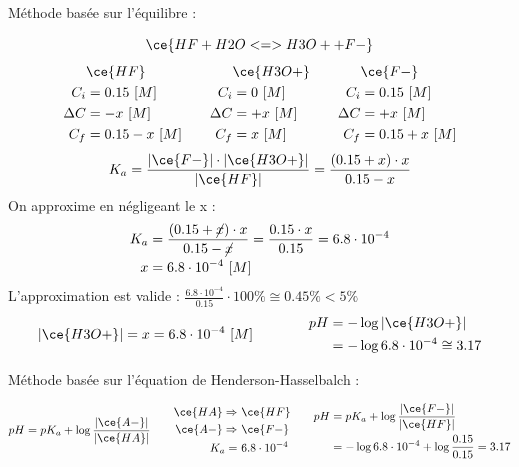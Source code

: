 \documentclass[
  11pt,
  a4paper,
  openany]{book}
\begin{document}
\begin{Answer}
Méthode basée sur l'équilibre :

\[
\ce{HF + H2O <=> H3O+ + F-}
\]
\[
\begin{split}
&\ce{HF}\\
C_i &= 0.15\ [M] \\
\Delta C &= - x\ [M] \\
C_f &= 0.15 - x\ [M] \\
\end{split}
\qquad
\begin{split}
&\ce{H3O+}\\
C_i &= 0\ [M] \\
\Delta C &= + x\ [M] \\
C_f &= x\ [M] \\
\end{split}
\qquad
\begin{split}
&\ce{F-}\\
C_i &= 0.15\ [M] \\
\Delta C &= + x\ [M] \\
C_f &= 0.15 + x\ [M] \\
\end{split}
\]
\[
K_a = \frac{|\ce{F-}| \cdot |\ce{H3O+}|}{|\ce{HF}|} = \frac{(0.15 + x) \cdot x}{0.15 - x}
\]
On approxime en négligeant le x :
\[
\begin{split}
K_a &= \frac{(0.15 + \cancel{x}) \cdot x}{0.15 - \cancel{x}} = \frac{0.15 \cdot x}{0.15} = 6.8 \cdot 10^{-4} \\
x &= 6.8 \cdot 10^{-4}\ [M]
\end{split}
\]
L'approximation est valide : \(\frac{6.8 \cdot 10^{-4}}{0.15} \cdot 100\% \cong 0.45\% < 5\%\)
\[
\begin{split}
|\ce{H3O+}| = x = 6.8 \cdot 10^{-4}\ [M]
\end{split}
\qquad\qquad
\begin{split}
pH &= - \log |\ce{H3O+}| \\
 &= - \log 6.8 \cdot 10^{-4} \cong 3.17
\end{split}
\]

Méthode basée sur l'équation de Henderson-Hasselbalch :

\[
\begin{split}
  pH = pK_a + \log \frac{|\ce{A-}|}{|\ce{HA}|}
\end{split}
\qquad
\begin{split}
  \ce{HA} \Rightarrow &\ \ce{HF} \\
  \ce{A-} \Rightarrow &\ \ce{F-} \\
  K_a = &\ 6.8 \cdot 10^{-4}
\end{split}
\qquad
\begin{split}
  pH &= pK_a + \log \frac{|\ce{F-}|}{|\ce{HF}|} \\
  &= - \log 6.8 \cdot 10^{-4} + \log \frac{0.15}{0.15} = 3.17 \\
\end{split}
\]

\end{Answer}
\end{document}
